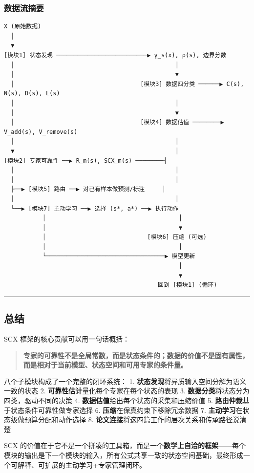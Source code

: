 \documentclass[
  12pt,
]{ctexart}
\begin{document}
\subsubsection{数据流摘要}\label{ux6570ux636eux6d41ux6458ux8981}

\begin{verbatim}
X (原始数据)
  │
  ▼
[模块1] 状态发现 ──────────────────────────▶ γ_s(x), ρ(s), 边界分数
  │                                              │
  │                                              ▼
  │                                    [模块3] 数据四分类 ──────▶ C(s), N(s), D(s), L(s)
  │                                              │
  │                                              ▼
  │                                    [模块4] 数据估值 ────────▶ V_add(s), V_remove(s)
  │                                              │
  ▼                                              │
[模块2] 专家可靠性 ──▶ R_m(s), SCX_m(s) ────────┤
  │                                              │
  │                                              │
  ├──▶ [模块5] 路由 ──▶ 对已有样本做预测/标注     │
  │                                              │
  └──▶ [模块7] 主动学习 ──▶ 选择 (s*, a*) ──▶ 执行动作
           │                                      │
           │                                      ▼
           │                             [模块6] 压缩 (可选)
           │                                      │
           └──────────────────────────────────▶ 模型更新
                                                  │
                                                  ▼
                                            回到 [模块1] (循环)
\end{verbatim}

\begin{center}\rule{0.5\linewidth}{0.5pt}\end{center}

\subsection{总结}\label{ux603bux7ed3}

SCX 框架的核心贡献可以用一句话概括：

\begin{quote}
\textbf{专家的可靠性不是全局常数，而是状态条件的；数据的价值不是固有属性，而是相对于当前模型、状态空间和可用专家的条件量。}
\end{quote}

八个子模块构成了一个完整的闭环系统： 1.
\textbf{状态发现}将异质输入空间分解为语义一致的状态 2.
\textbf{可靠性估计}量化每个专家在每个状态的表现 3.
\textbf{数据分类}将状态分为四类，驱动不同的决策 4.
\textbf{数据估值}给出每个状态的采集和压缩价值 5.
\textbf{路由仲裁}基于状态条件可靠性做专家选择 6.
\textbf{压缩}在保真约束下移除冗余数据 7.
\textbf{主动学习}在状态级做预算分配和动作选择 8.
\textbf{论文连接}将这四篇工作的层次关系和传承路径说清楚

SCX
的价值在于它不是一个拼凑的工具箱，而是一个\textbf{数学上自洽的框架}------每个模块的输出是下一个模块的输入，所有公式共享一致的状态空间基础，最终形成一个可解释、可扩展的主动学习+专家管理闭环。
\end{document}
